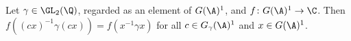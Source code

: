 Let $\gamma\in\GL_2(\Q)$, regarded as an element of $G(\A)^1$, and $f\colon G(\A)^1\to\C$. Then
$f((cx)^{-1}\gamma(cx))=f(x^{-1}\gamma x)$ for all $c\in G_\gamma(\A)^1$ and $x\in G(\A)^1$.
